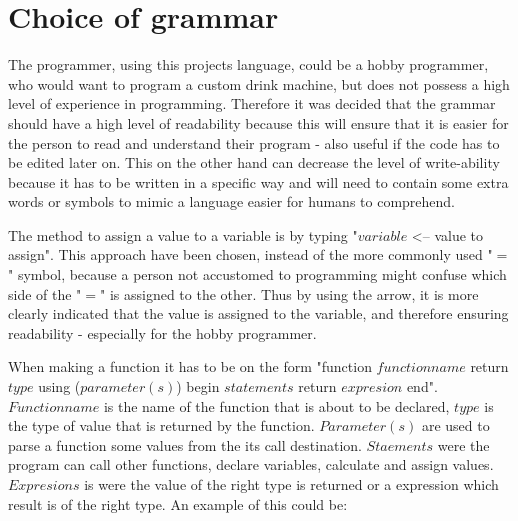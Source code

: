 \section{Choice of grammar}
\label{sec:grammachoice}
The programmer, using this projects language, could be a hobby programmer, who would want to program a custom drink machine, but does not possess a high level of experience in programming. Therefore it was decided that the grammar should have a high level of readability because this will ensure that it is easier for the person to read and understand their program - also useful if the code has to be edited later on. This on the other hand can decrease the level of write-ability because it has to be written in a specific way and will need to contain some extra words or symbols to mimic a language easier for humans to comprehend.

The method to assign a value to a variable is by typing "$variable$ <-- value to assign". This approach have been chosen, instead of the more commonly used "$=$" symbol, because a person not accustomed to programming might confuse which side of the "$=$" is assigned to the other. Thus by using the arrow, it is more clearly indicated that the value is assigned to the variable, and therefore ensuring readability - especially for the hobby programmer.

When making a function it has to be on the form "function $functionname$ return $type$ using ($parameter(s)$) begin $statements$ return $expresion$ end". $Functionname$ is the name of the function that is about to be declared, $type$ is the type of value that is returned by the function. $Parameter(s)$ are used to parse a function some values from the its call destination. $Staements$ were the program can call other functions, declare variables, calculate and assign values. $Expresions$ is were the value of the right type is returned or a expression which result is of the right type.
An example of this could be:

